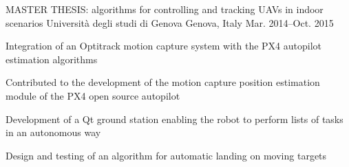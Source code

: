 


\vspace{-5pt}
\begin{cventries}
  \cventry
  {MASTER THESIS: algorithms for controlling and tracking UAVs in indoor scenarios} %
  {Università degli studi di Genova} %
  {Genova, Italy} %
  {Mar. 2014–Oct. 2015} %
  {
    \begin{cvitems} %
      \item {Integration of an Optitrack motion capture system with the PX4 autopilot estimation algorithms}
      \item {Contributed to the development of the motion capture position estimation module of the PX4 open source autopilot}
      \item {Development of a Qt ground station enabling the robot to perform lists of tasks in an autonomous way}
      \item {Design and testing of an algorithm for automatic landing on moving targets}
    \end{cvitems}
  }


\end{cventries}
